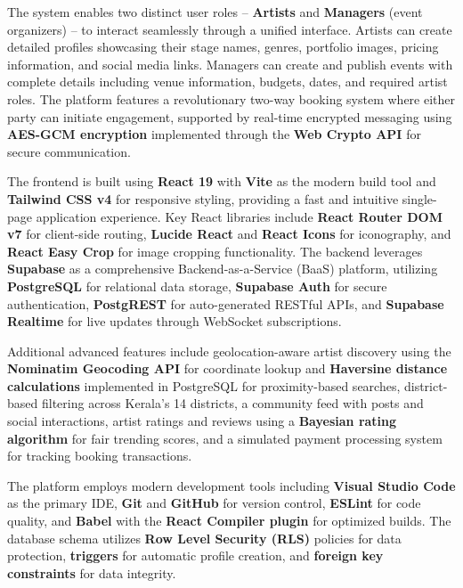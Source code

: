 \documentclass[12pt,a4paper]{report}
\begin{document}
The system enables two distinct user roles -- \textbf{Artists} and \textbf{Managers} (event organizers) -- to interact seamlessly through a unified interface. Artists can create detailed profiles showcasing their stage names, genres, portfolio images, pricing information, and social media links. Managers can create and publish events with complete details including venue information, budgets, dates, and required artist roles. The platform features a revolutionary two-way booking system where either party can initiate engagement, supported by real-time encrypted messaging using \textbf{AES-GCM encryption} implemented through the \textbf{Web Crypto API} for secure communication.

The frontend is built using \textbf{React 19} with \textbf{Vite} as the modern build tool and \textbf{Tailwind CSS v4} for responsive styling, providing a fast and intuitive single-page application experience. Key React libraries include \textbf{React Router DOM v7} for client-side routing, \textbf{Lucide React} and \textbf{React Icons} for iconography, and \textbf{React Easy Crop} for image cropping functionality. The backend leverages \textbf{Supabase} as a comprehensive Backend-as-a-Service (BaaS) platform, utilizing \textbf{PostgreSQL} for relational data storage, \textbf{Supabase Auth} for secure authentication, \textbf{PostgREST} for auto-generated RESTful APIs, and \textbf{Supabase Realtime} for live updates through WebSocket subscriptions.

Additional advanced features include geolocation-aware artist discovery using the \textbf{Nominatim Geocoding API} for coordinate lookup and \textbf{Haversine distance calculations} implemented in PostgreSQL for proximity-based searches, district-based filtering across Kerala's 14 districts, a community feed with posts and social interactions, artist ratings and reviews using a \textbf{Bayesian rating algorithm} for fair trending scores, and a simulated payment processing system for tracking booking transactions.

The platform employs modern development tools including \textbf{Visual Studio Code} as the primary IDE, \textbf{Git} and \textbf{GitHub} for version control, \textbf{ESLint} for code quality, and \textbf{Babel} with the \textbf{React Compiler plugin} for optimized builds. The database schema utilizes \textbf{Row Level Security (RLS)} policies for data protection, \textbf{triggers} for automatic profile creation, and \textbf{foreign key constraints} for data integrity.
\end{document}
